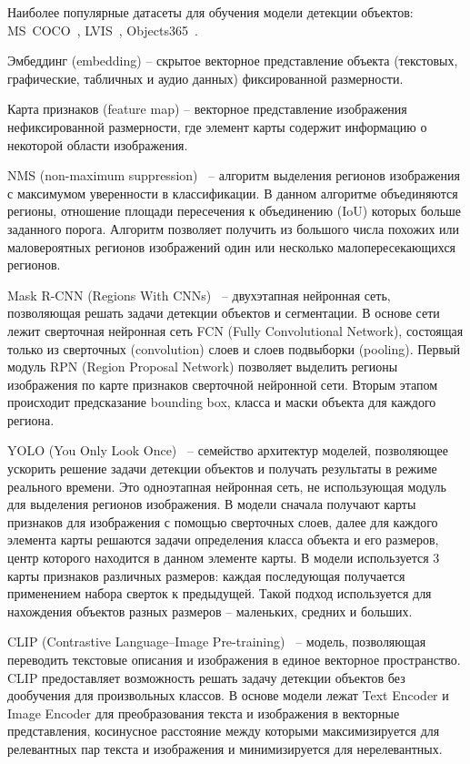 \documentclass[a4paper,14pt]{article}
\begin{document}
	Наиболее популярные датасеты для обучения модели детекции объектов: MS~COCO~\cite{COCO}, LVIS~\cite{LVIS}, Objects365~\cite{Objects365}.
	
	Эмбеддинг (embedding) -- скрытое векторное представление объекта (текстовых, графические, табличных и аудио данных) фиксированной размерности.
	
	Карта признаков (feature map) -- векторное представление изображения нефиксированной размерности, где элемент карты содержит информацию о некоторой области изображения.
	
	NMS (non-maximum suppression)~\cite{neubeck2006efficient} -- алгоритм выделения регионов изображения с максимумом уверенности в классификации.
	В данном алгоритме объединяются регионы, отношение площади пересечения к объединению (IoU) которых больше заданного порога.
	Алгоритм позволяет получить из большого числа похожих или маловероятных регионов изображений один или несколько малопересекающихся регионов.
	
	Mask R-CNN (Regions With CNNs)~\cite{MaskRCNN} -- двухэтапная нейронная сеть, позволяющая решать задачи детекции объектов и сегментации. В основе сети лежит сверточная нейронная сеть FCN (Fully Convolutional Network), состоящая только из сверточных (convolution) слоев и слоев подвыборки (pooling). Первый модуль RPN (Region Proposal Network) позволяет выделить регионы изображения по карте признаков сверточной нейронной сети. Вторым этапом происходит предсказание bounding box, класса и маски объекта для каждого региона.
	
	YOLO (You Only Look Once)~\cite{redmon2016you} -- семейство архитектур моделей, позволяющее  ускорить решение задачи детекции объектов и получать результаты в режиме реального времени.
	Это одноэтапная нейронная сеть, не использующая модуль для выделения регионов изображения.
	В модели сначала получают карты признаков для изображения с помощью сверточных слоев, далее для каждого элемента карты решаются задачи определения класса объекта и его размеров, центр которого находится в данном элементе карты.
	В модели используется 3 карты признаков различных размеров: каждая последующая получается применением набора сверток к предыдущей.
	Такой подход используется для нахождения объектов разных размеров -- маленьких, средних и больших.
	
	CLIP (Contrastive Language–Image Pre-training)~\cite{CLIP} -- модель, позволяющая переводить текстовые описания и изображения в единое векторное пространство. 
	CLIP предоставляет возможность решать задачу детекции объектов без дообучения для произвольных классов.
	В основе модели лежат Text Encoder и Image Encoder для преобразования текста и изображения в векторные представления, косинусное расстояние между которыми максимизируется для релевантных пар текста и изображения и минимизируется для нерелевантных.
	
\end{document}
